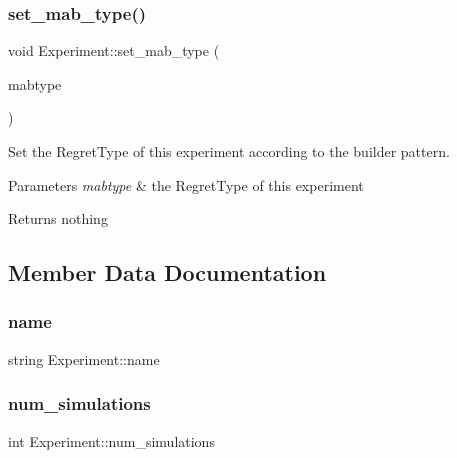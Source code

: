 \subsubsection{\texorpdfstring{set\+\_\+mab\+\_\+type()}{set\_mab\_type()}}
{\footnotesize\ttfamily void Experiment\+::set\+\_\+mab\+\_\+type (\begin{DoxyParamCaption}\item[{\mbox{\hyperlink{mab_8h_ab8d3b06b9f83219c5bb8daa68136f908}{Regret\+Type}}}]{mabtype }\end{DoxyParamCaption})}



Set the Regret\+Type of this experiment according to the builder pattern. 


\begin{DoxyParams}{Parameters}
{\em mabtype} & the Regret\+Type of this experiment \\
\hline
\end{DoxyParams}
\begin{DoxyReturn}{Returns}
nothing 
\end{DoxyReturn}


\subsection{Member Data Documentation}
\mbox{\label{class_experiment_a2e451e5a87839f29986a54bf69715a79}} 
\subsubsection{\texorpdfstring{name}{name}}
{\footnotesize\ttfamily string Experiment\+::name}

\mbox{\label{class_experiment_ad95d4677faced6cf6b2d1f037f07901a}} 
\subsubsection{\texorpdfstring{num\+\_\+simulations}{num\_simulations}}
{\footnotesize\ttfamily int Experiment\+::num\+\_\+simulations}

\mbox{\label{class_experiment_a5afc2955f4e99280fe0f4e8023582aec}} 
